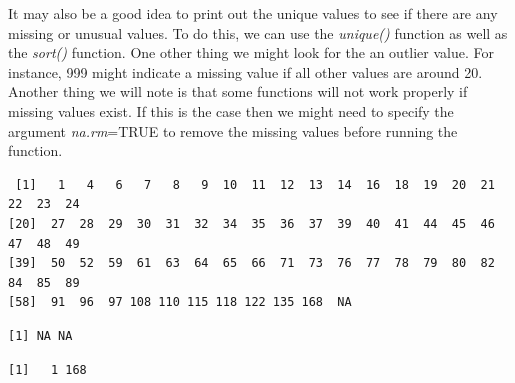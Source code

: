 \documentclass[
  letterpaper,
  DIV=11,
  numbers=noendperiod]{scrreprt}
\newenvironment{Shaded}{\begin{snugshade}}{\end{snugshade}}
\newcommand{\AttributeTok}[1]{\textcolor[rgb]{0.40,0.45,0.13}{#1}}
\newcommand{\ConstantTok}[1]{\textcolor[rgb]{0.56,0.35,0.01}{#1}}
\newcommand{\FunctionTok}[1]{\textcolor[rgb]{0.28,0.35,0.67}{#1}}
\newcommand{\NormalTok}[1]{\textcolor[rgb]{0.00,0.23,0.31}{#1}}
\newcommand{\SpecialCharTok}[1]{\textcolor[rgb]{0.37,0.37,0.37}{#1}}
\begin{document}
It may also be a good idea to print out the unique values to see if
there are any missing or unusual values. To do this, we can use the
\emph{unique()} function as well as the \emph{sort()} function. One
other thing we might look for the an outlier value. For instance, 999
might indicate a missing value if all other values are around 20.
Another thing we will note is that some functions will not work properly
if missing values exist. If this is the case then we might need to
specify the argument \emph{na.rm}=TRUE to remove the missing values
before running the function.

\begin{Shaded}
\end{Shaded}

\begin{verbatim}
 [1]   1   4   6   7   8   9  10  11  12  13  14  16  18  19  20  21  22  23  24
[20]  27  28  29  30  31  32  34  35  36  37  39  40  41  44  45  46  47  48  49
[39]  50  52  59  61  63  64  65  66  71  73  76  77  78  79  80  82  84  85  89
[58]  91  96  97 108 110 115 118 122 135 168  NA
\end{verbatim}

\begin{Shaded}
\end{Shaded}

\begin{verbatim}
[1] NA NA
\end{verbatim}

\begin{Shaded}
\end{Shaded}

\begin{verbatim}
[1]   1 168
\end{verbatim}

\begin{Shaded}
\end{Shaded}
\end{document}
